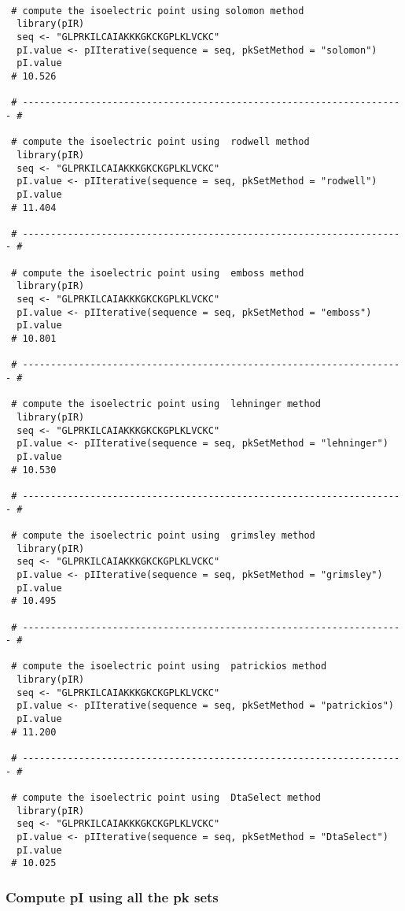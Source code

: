 \documentclass{article}
\begin{document}
\begin{verbatim}

 # compute the isoelectric point using solomon method
  library(pIR)
  seq <- "GLPRKILCAIAKKKGKCKGPLKLVCKC"
  pI.value <- pIIterative(sequence = seq, pkSetMethod = "solomon")
  pI.value
 # 10.526

 # -------------------------------------------------------------------- #

 # compute the isoelectric point using  rodwell method
  library(pIR)
  seq <- "GLPRKILCAIAKKKGKCKGPLKLVCKC"
  pI.value <- pIIterative(sequence = seq, pkSetMethod = "rodwell")
  pI.value
 # 11.404

 # -------------------------------------------------------------------- #

 # compute the isoelectric point using  emboss method
  library(pIR)
  seq <- "GLPRKILCAIAKKKGKCKGPLKLVCKC"
  pI.value <- pIIterative(sequence = seq, pkSetMethod = "emboss")
  pI.value
 # 10.801

 # -------------------------------------------------------------------- #

 # compute the isoelectric point using  lehninger method
  library(pIR)
  seq <- "GLPRKILCAIAKKKGKCKGPLKLVCKC"
  pI.value <- pIIterative(sequence = seq, pkSetMethod = "lehninger")
  pI.value
 # 10.530

 # -------------------------------------------------------------------- #

 # compute the isoelectric point using  grimsley method
  library(pIR)
  seq <- "GLPRKILCAIAKKKGKCKGPLKLVCKC"
  pI.value <- pIIterative(sequence = seq, pkSetMethod = "grimsley")
  pI.value
 # 10.495

 # -------------------------------------------------------------------- #

 # compute the isoelectric point using  patrickios method
  library(pIR)
  seq <- "GLPRKILCAIAKKKGKCKGPLKLVCKC"
  pI.value <- pIIterative(sequence = seq, pkSetMethod = "patrickios")
  pI.value
 # 11.200

 # -------------------------------------------------------------------- #

 # compute the isoelectric point using  DtaSelect method
  library(pIR)
  seq <- "GLPRKILCAIAKKKGKCKGPLKLVCKC"
  pI.value <- pIIterative(sequence = seq, pkSetMethod = "DtaSelect")
  pI.value
 # 10.025

\end{verbatim}

\subsubsection{Compute pI using all the pk sets}
\end{document}
